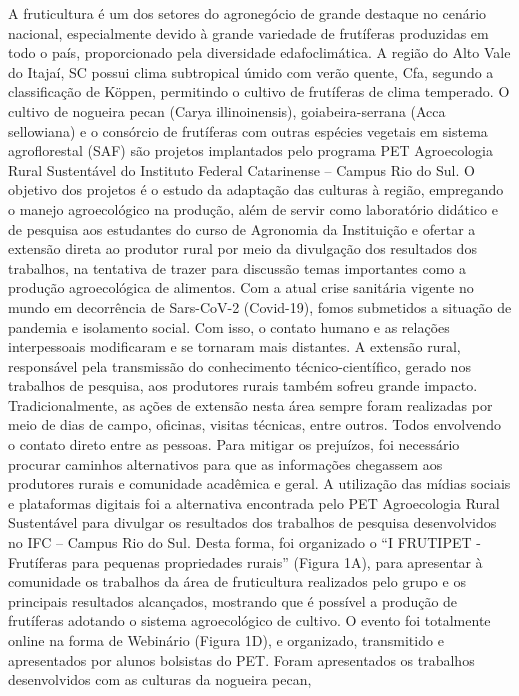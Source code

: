 A fruticultura é um dos setores do agronegócio de grande destaque no cenário nacional, 
especialmente devido à grande variedade de frutíferas produzidas em todo o país, proporcionado 
pela diversidade edafoclimática. A região do Alto Vale do Itajaí, SC possui clima subtropical 
úmido com verão quente, Cfa, segundo a classificação de Köppen, permitindo o cultivo de 
frutíferas de clima temperado. O cultivo de nogueira pecan (Carya illinoinensis), goiabeira-serrana 
(Acca sellowiana) e o consórcio de frutíferas com outras espécies vegetais em sistema agroflorestal 
(SAF) são projetos implantados pelo programa PET Agroecologia Rural Sustentável do Instituto 
Federal Catarinense – Campus Rio do Sul. O objetivo dos projetos é o estudo da adaptação das 
culturas à região, empregando o manejo agroecológico na produção, além de servir como 
laboratório didático e de pesquisa aos estudantes do curso de Agronomia da Instituição e ofertar a 
extensão direta ao produtor rural por meio da divulgação dos resultados dos trabalhos, na tentativa 
de trazer para discussão temas importantes como a produção agroecológica de alimentos.
Com a atual crise sanitária vigente no mundo em decorrência de Sars-CoV-2 (Covid-19), 
fomos submetidos a situação de pandemia e isolamento social. Com isso, o contato humano e as 
relações interpessoais modificaram e se tornaram mais distantes. A extensão rural, responsável 
pela transmissão do conhecimento técnico-científico, gerado nos trabalhos de pesquisa, aos 
produtores rurais também sofreu grande impacto. Tradicionalmente, as ações de extensão nesta 
área sempre foram realizadas por meio de dias de campo, oficinas, visitas técnicas, entre outros. 
Todos envolvendo o contato direto entre as pessoas. Para mitigar os prejuízos, foi necessário 
procurar caminhos alternativos para que as informações chegassem aos produtores rurais e 
comunidade acadêmica e geral. A utilização das mídias sociais e plataformas digitais foi a 
alternativa encontrada pelo PET Agroecologia Rural Sustentável para divulgar os resultados dos 
trabalhos de pesquisa desenvolvidos no IFC – Campus Rio do Sul. 
Desta forma, foi organizado o “I FRUTIPET - Frutíferas para pequenas propriedades 
rurais” (Figura 1A), para apresentar à comunidade os trabalhos da área de fruticultura realizados 
pelo grupo e os principais resultados alcançados, mostrando que é possível a produção de frutíferas 
adotando o sistema agroecológico de cultivo. O evento foi totalmente online na forma de 
Webinário (Figura 1D), e organizado, transmitido e apresentados por alunos bolsistas do PET.
Foram apresentados os trabalhos desenvolvidos com as culturas da nogueira pecan, 
